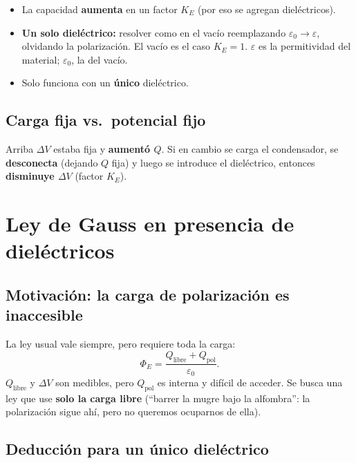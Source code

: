 \documentclass[12pt,a4paper]{article}
\begin{document}
\begin{itemize}[nosep]
  \item La capacidad \textbf{aumenta} en un factor $K_E$ (por eso se
        agregan dieléctricos).
  \item \textbf{Un solo dieléctrico:} resolver como en el vacío
        reemplazando $\varepsilon_0 \to \varepsilon$, olvidando la
        polarización. El vacío es el caso $K_E=1$. $\varepsilon$ es la
        permitividad del material; $\varepsilon_0$, la del vacío.
  \item Solo funciona con un \textbf{único} dieléctrico.
\end{itemize}

\subsection{Carga fija vs.\ potencial fijo}

\begin{notebox}[Ejercicio]
  Arriba $\Delta V$ estaba fija y \textbf{aumentó $Q$}. Si en cambio se
  carga el condensador, se \textbf{desconecta} (dejando $Q$ fija) y luego
  se introduce el dieléctrico, entonces \textbf{disminuye $\Delta V$}
  (factor $K_E$).
\end{notebox}



\section{Ley de Gauss en presencia de dieléctricos}

\subsection{Motivación: la carga de polarización es inaccesible}

La ley usual vale siempre, pero requiere toda la carga:
\[
\Phi_E = \frac{Q_{\text{libre}} + Q_{\text{pol}}}{\varepsilon_0}.
\]
$Q_{\text{libre}}$ y $\Delta V$ son medibles, pero $Q_{\text{pol}}$ es
interna y difícil de acceder. Se busca una ley que use \textbf{solo la
carga libre} (\enquote{barrer la mugre bajo la alfombra}: la polarización
sigue ahí, pero no queremos ocuparnos de ella).

\subsection{Deducción para un único dieléctrico}
\end{document}
